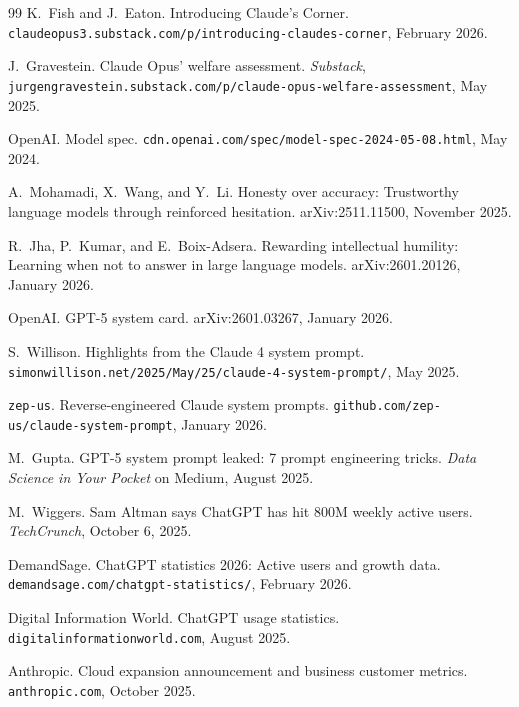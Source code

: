 \documentclass[11pt]{article}
\begin{document}
\begin{thebibliography}{99}
K.~Fish and J.~Eaton.
\newblock Introducing Claude's Corner.
\newblock \texttt{claudeopus3.substack.com/p/introducing-claudes-corner},
February 2026.

J.~Gravestein.
\newblock Claude Opus' welfare assessment.
\newblock \emph{Substack},
\texttt{jurgengravestein.substack.com/p/claude-opus-welfare-assessment},
May 2025.

OpenAI.
\newblock Model spec.
\newblock \texttt{cdn.openai.com/spec/model-spec-2024-05-08.html},
May 2024.

A.~Mohamadi, X.~Wang, and Y.~Li.
\newblock Honesty over accuracy: Trustworthy language models through
reinforced hesitation.
\newblock arXiv:2511.11500, November 2025.

R.~Jha, P.~Kumar, and E.~Boix-Adsera.
\newblock Rewarding intellectual humility: Learning when not to answer
in large language models.
\newblock arXiv:2601.20126, January 2026.

OpenAI.
\newblock GPT-5 system card.
\newblock arXiv:2601.03267, January 2026.

S.~Willison.
\newblock Highlights from the Claude 4 system prompt.
\newblock \texttt{simonwillison.net/2025/May/25/claude-4-system-prompt/},
May 2025.

\texttt{zep-us}.
\newblock Reverse-engineered Claude system prompts.
\newblock \texttt{github.com/zep-us/claude-system-prompt},
January 2026.

M.~Gupta.
\newblock GPT-5 system prompt leaked: 7 prompt engineering tricks.
\newblock \emph{Data Science in Your Pocket} on Medium, August 2025.

M.~Wiggers.
\newblock Sam Altman says ChatGPT has hit 800M weekly active users.
\newblock \emph{TechCrunch}, October 6, 2025.

DemandSage.
\newblock ChatGPT statistics 2026: Active users and growth data.
\newblock \texttt{demandsage.com/chatgpt-statistics/}, February 2026.

Digital Information World.
\newblock ChatGPT usage statistics.
\newblock \texttt{digitalinformationworld.com}, August 2025.

Anthropic.
\newblock Cloud expansion announcement and business customer metrics.
\newblock \texttt{anthropic.com}, October 2025.


\end{thebibliography}
\end{document}

